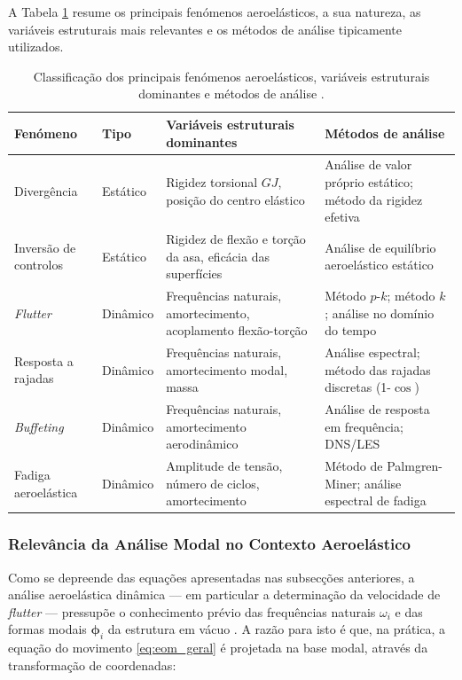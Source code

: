 \documentclass[a4paper,fleqn]{cas-sc}
\begin{document}
A Tabela \ref{tab:fenomenos_aero} resume os principais fenómenos aeroelásticos, a sua natureza, as variáveis estruturais mais relevantes e os métodos de análise tipicamente utilizados.

\begin{table}
\centering
\caption{Classificação dos principais fenómenos aeroelásticos, variáveis 
estruturais dominantes e métodos de análise \cite{Wright2015, Dowell2004}.}
\label{tab:fenomenos_aero}
\renewcommand{\arraystretch}{1.4}
\begin{tabularx}{\textwidth}{>{\RaggedRight}p{2cm}  l >{\RaggedRight}X >{\RaggedRight}X}
\toprule
\textbf{Fenómeno} & \textbf{Tipo} & \textbf{Variáveis estruturais dominantes} & \textbf{Métodos de análise} \\
\midrule
Divergência & Estático & Rigidez torsional $GJ$, posição do centro elástico & Análise de valor próprio estático; método da rigidez efetiva \\
\midrule
Inversão de controlos & Estático & Rigidez de flexão e torção da asa, eficácia das superfícies & Análise de equilíbrio aeroelástico estático \\
\midrule
\textit{Flutter} & Dinâmico & Frequências naturais, amortecimento, acoplamento flexão-torção & Método $p$-$k$; método $k$; análise no domínio do tempo \\
\midrule
Resposta a rajadas & Dinâmico & Frequências naturais, amortecimento modal, massa & Análise espectral; método das rajadas discretas (1-$\cos$) \\
\midrule
\textit{Buffeting} & Dinâmico & Frequências naturais, amortecimento aerodinâmico & Análise de resposta em frequência; DNS/LES \\
\midrule
Fadiga aeroelástica & Dinâmico & Amplitude de tensão, número de ciclos, amortecimento & Método de Palmgren-Miner; análise espectral de fadiga \\
\bottomrule
\end{tabularx}
\end{table}

\subsubsection{Relevância da Análise Modal no Contexto Aeroelástico}

Como se depreende das equações apresentadas nas subsecções anteriores, a análise aeroelástica dinâmica --- em particular a determinação da velocidade de \textit{flutter} --- pressupõe o conhecimento prévio das frequências naturais $\omega_i$ e das formas modais $\boldsymbol{\phi}_i$ da estrutura em vácuo \cite{Craig2006}. A razão para isto é que, na prática, a equação do movimento \eqref{eq:eom_geral} é projetada na base modal, através da transformação de coordenadas:
\end{document}
